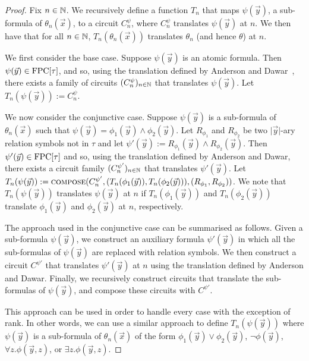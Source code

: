 \documentclass[../paper.tex]{subfiles}
\begin{document}
\begin{proof}
  Fix $n \in \mathbb{N}$. We recursively define a function $T_n$ that maps $\psi
  (\vec{y})$, a sub-formula of $\theta_n(\vec{x})$, to a circuit $C^{\psi}_n$,
  where $C^{\psi}_n$ translates $\psi(\vec{y})$ at $n$. We then have that for
  all $n \in \mathbb{N}$, $T_n(\theta_n(\vec{x}))$ translates $\theta_n$ (and hence
  $\theta$) at $n$.

  We first consider the base case. Suppose $\psi(\vec{y})$ is an atomic formula.
  Then $\psi(\vec{y}) \in \text{\upshape FPC}[\tau]$, and so, using the translation defined by
  Anderson and Dawar~\cite{AndersonD17}, there exists a family of circuits
  $(C^{\psi}_n)_{n \in \mathbb{N}}$ that translates $\psi(\vec{y})$. Let
  $T_n(\psi(\vec{y})) := C^{\psi}_n$.

  We now consider the conjunctive case. Suppose $\psi(\vec{y})$ is a sub-formula
  of $\theta_n(\vec{x})$ such that $\psi (\vec{y}) = \phi_1(\vec{y}) \land
  \phi_2(\vec{y})$. Let $R_{\phi_1}$ and $R_{\phi_2}$ be two $\vert \vec{y}
  \vert$-ary relation symbols not in $\tau$ and let $\psi' (\vec{y}) :=
  R_{\phi_1}(\vec{y}) \land R_{\phi_2}(\vec{y})$. Then $\psi'(\vec{y}) \in
  \text{\upshape FPC}[\tau]$ and so, using the translation defined by Anderson and Dawar, there
  exists a circuit family $(C^{\psi'}_n)_{n \in \mathbb{N}}$ that translates
  $\psi'(\vec{y})$. Let $T_n(\psi (\vec{y})) := {\normalfont\textsc{compose}}(C^{\psi'}_n, (
  T_n(\phi_1(\vec{y})), T_n(\phi_2(\vec{y}))), (R_{\phi_1}, R_{\phi_2}))$. We
  note that $T_n(\psi(\vec{y}))$ translates $\psi (\vec{y})$ at $n$ if
  $T_n(\phi_1 (\vec{y}))$ and $T_n(\phi_2(\vec{y}))$ translate $\phi_1(\vec{y})$
  and $\phi_2(\vec{y})$ at $n$, respectively.

  The approach used in the conjunctive case can be summarised as follows. Given
  a sub-formula $\psi (\vec{y})$, we construct an auxiliary formula
  $\psi'(\vec{y})$ in which all the sub-formulas of $\psi(\vec{y})$ are replaced
  with relation symbols. We then construct a circuit $C^{\psi'}$ that translates
  $\psi'(\vec{y})$ at $n$ using the translation defined by Anderson and Dawar.
  Finally, we recursively construct circuits that translate the sub-formulas of
  $\psi(\vec{y})$, and compose these circuits with $C^{\psi'}$.
  
  This approach can be used in order to handle every case with the exception of
  rank. In other words, we can use a similar approach to define
  $T_n(\psi(\vec{y}))$ where $\psi(\vec{y})$ is a sub-formula of
  $\theta_n(\vec{x})$ of the form $\phi_1(\vec{y}) \lor \phi_2(\vec{y})$, $\neg
  \phi(\vec{y})$, $\forall z. \phi (\vec{y}, z)$, or $\exists z. \phi (\vec{y},
  z)$.


\end{proof}
\end{document}

